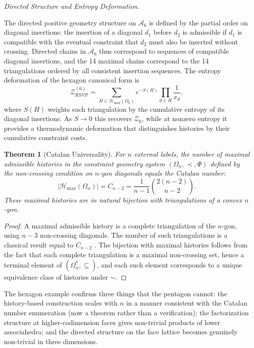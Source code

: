 \documentclass[11pt]{article}
\theoremstyle{plain}
\newtheorem{theorem}{Theorem}[section]
\theoremstyle{definition}
\theoremstyle{remark}
\newcommand{\Phif}{\Phi}
\newcommand{\Sf}{S}
\newcommand{\OmKS}{\Omega}
\newcommand{\ZRSVP}{\mathcal{Z}_{\mathrm{RSVP}}}
\newcommand{\Hmax}{\mathcal{H}_{\max}}
\begin{document}
\medskip\noindent\textit{Directed Structure and Entropy Deformation.}

The directed positive geometry structure on $\mathcal{A}_6$ is defined by the partial order on diagonal insertions: the insertion of a diagonal $d_1$ before $d_2$ is admissible if $d_1$ is compatible with the eventual constraint that $d_2$ must also be inserted without crossing. Directed chains in $\mathcal{A}_6$ thus correspond to sequences of compatible diagonal insertions, and the 14 maximal chains correspond to the 14 triangulations ordered by all consistent insertion sequences. The entropy deformation of the hexagon canonical form is
\[
  \ZRSVP^{(6)} = \sum_{H \in \Hmax(\OmKS_6)} e^{-\Sf(H)} \prod_{d \in H} \frac{1}{x_d},
\]
where $\Sf(H)$ weights each triangulation by the cumulative entropy of its diagonal insertions. As $\Sf \to 0$ this recovers $\mathcal{Z}_6$, while at nonzero entropy it provides a thermodynamic deformation that distinguishes histories by their cumulative constraint costs.

\begin{theorem}[Catalan Universality]
\label{thm:catalan}
For $n$ external labels, the number of maximal admissible histories in the constraint geometry system $(\OmKS_n, \prec, \Phif)$ defined by the non-crossing condition on $n$-gon diagonals equals the Catalan number:
\[
  |\Hmax(\OmKS_n)| = C_{n-2} = \frac{1}{n-1}\binom{2(n-2)}{n-2}.
\]
These maximal histories are in natural bijection with triangulations of a convex $n$-gon.
\end{theorem}

\begin{proof}
A maximal admissible history is a complete triangulation of the $n$-gon, using $n-3$ non-crossing diagonals. The number of such triangulations is a classical result equal to $C_{n-2}$ \cite{Stanley1997}. The bijection with maximal histories follows from the fact that each complete triangulation is a maximal non-crossing set, hence a terminal element of $(\OmKS_n^*, \subseteq)$, and each such element corresponds to a unique equivalence class of histories under $\sim$.
\end{proof}

The hexagon example confirms three things that the pentagon cannot: the history-based construction scales with $n$ in a manner consistent with the Catalan number enumeration (now a theorem rather than a verification); the factorization structure at higher-codimension faces gives non-trivial products of lower associahedra; and the directed structure on the face lattice becomes genuinely non-trivial in three dimensions.
\end{document}
